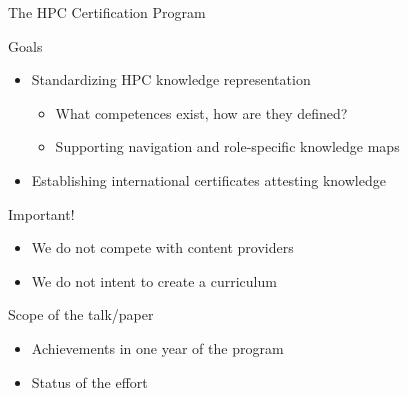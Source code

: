 \documentclass[compress,aspectratio=169]{beamer}
\begin{document}
\begin{frame}{The HPC Certification Program}
		\begin{block}{Goals}
			\vspace*{-0.25em}
			\begin{itemize}
				\item Standardizing HPC knowledge representation
          \begin{itemize}
						\item What competences exist, how are they defined?
            \item Supporting navigation and role-specific knowledge maps
          \end{itemize}
				\item Establishing international certificates attesting knowledge
			\end{itemize}
		\end{block}


		\vspace*{-0.25em}
		\begin{block}{Important!}
			\vspace*{-0.25em}
			\begin{itemize}
				\item We do not compete with content providers
				\item We do not intent to create a curriculum
			\end{itemize}
		\end{block}

		\vspace*{-0.25em}
		\begin{block}{Scope of the talk/paper}
			\vspace*{-0.25em}
			\begin{itemize}
				\item Achievements in one year of the program
				\item Status of the effort
			\end{itemize}
		\end{block}

\end{frame}
\end{document}
